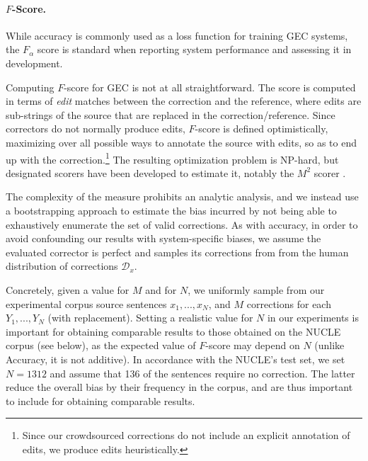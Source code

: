\documentclass[letter,11pt]{article}
\begin{document}
\paragraph{$F$-Score.}
While accuracy is commonly used as a loss function for training GEC systems,
the $F_\alpha$ score is standard when reporting system performance {\color{red} and assessing it in development}.

Computing $F$-score for GEC is not at all straightforward.
The score is computed in terms of {\it edit} matches between the correction and the reference,
where edits are sub-strings of the source that are replaced in the correction/reference.
Since correctors do not normally produce edits, $F$-score is defined optimistically, maximizing
over all possible ways to annotate the source with edits,
so as to end up with the correction.\footnote{Since our crowdsourced corrections
  do not include an explicit annotation of edits, we produce edits heuristically.}
The resulting optimization problem is NP-hard, but designated scorers
have been developed to estimate it, notably the $M^2$ scorer 
\cite{dahlmeier2012better}.

The complexity of the measure prohibits an analytic analysis, and
we instead use a bootstrapping approach to estimate the bias incurred
by not being able to exhaustively enumerate the set of valid corrections.
As with accuracy,
in order to avoid confounding our results with system-specific biases,
we assume the evaluated corrector is perfect and samples its corrections from
from the human distribution of corrections $\mathcal{D}_x$.

Concretely, given a value for $M$ and for $N$, we uniformly sample from our experimental
corpus source sentences $x_1,...,x_N$, and $M$ corrections for each $Y_1,...,Y_N$ (with replacement).
Setting a realistic value for $N$ in our experiments is important
for obtaining comparable results to those obtained on the NUCLE corpus (see below), 
as the expected value of $F$-score may depend on $N$ (unlike Accuracy, it is not additive).
In accordance with the NUCLE's test set,
we set $N=1312$ and assume that 136 of the sentences require no correction.
The latter reduce the overall bias by their frequency in the corpus,
and are thus important to include for obtaining comparable results.
\end{document}
